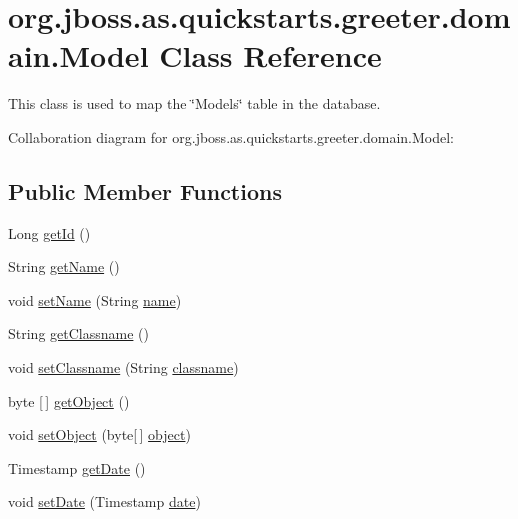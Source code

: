 \hypertarget{classorg_1_1jboss_1_1as_1_1quickstarts_1_1greeter_1_1domain_1_1_model}{}\section{org.\+jboss.\+as.\+quickstarts.\+greeter.\+domain.\+Model Class Reference}
\label{classorg_1_1jboss_1_1as_1_1quickstarts_1_1greeter_1_1domain_1_1_model}


This class is used to map the \char`\"{}\+Models\char`\"{} table in the database.  




Collaboration diagram for org.\+jboss.\+as.\+quickstarts.\+greeter.\+domain.\+Model\+:
\subsection*{Public Member Functions}
\begin{DoxyCompactItemize}
\item 
Long \hyperlink{classorg_1_1jboss_1_1as_1_1quickstarts_1_1greeter_1_1domain_1_1_model_a16fdd8977d13de78bc32beb058b595f7}{get\+Id} ()
\item 
String \hyperlink{classorg_1_1jboss_1_1as_1_1quickstarts_1_1greeter_1_1domain_1_1_model_ab66dbfbb26fd2d261f02388397b66db1}{get\+Name} ()
\item 
void \hyperlink{classorg_1_1jboss_1_1as_1_1quickstarts_1_1greeter_1_1domain_1_1_model_a0f33d9ffbe653cd50c8c334e7f8c49ff}{set\+Name} (String \hyperlink{classorg_1_1jboss_1_1as_1_1quickstarts_1_1greeter_1_1domain_1_1_model_a9e9a3d455bb7e29de4f5f1d28c3b21f1}{name})
\item 
String \hyperlink{classorg_1_1jboss_1_1as_1_1quickstarts_1_1greeter_1_1domain_1_1_model_a041be61bcc932edf5a1629c4c5b10bbd}{get\+Classname} ()
\item 
void \hyperlink{classorg_1_1jboss_1_1as_1_1quickstarts_1_1greeter_1_1domain_1_1_model_aa4c2b7364259d77fdae599e67d12246a}{set\+Classname} (String \hyperlink{classorg_1_1jboss_1_1as_1_1quickstarts_1_1greeter_1_1domain_1_1_model_ad7f79460581991f10f809399af81deed}{classname})
\item 
byte \mbox{[}$\,$\mbox{]} \hyperlink{classorg_1_1jboss_1_1as_1_1quickstarts_1_1greeter_1_1domain_1_1_model_a76e62d859cf14a164639170dd87ce4ff}{get\+Object} ()
\item 
void \hyperlink{classorg_1_1jboss_1_1as_1_1quickstarts_1_1greeter_1_1domain_1_1_model_ad3694337d40d3e4f51fd10b15f8cae6c}{set\+Object} (byte\mbox{[}$\,$\mbox{]} \hyperlink{classorg_1_1jboss_1_1as_1_1quickstarts_1_1greeter_1_1domain_1_1_model_a1c1b50288522353b7e49a08abaa60153}{object})
\item 
Timestamp \hyperlink{classorg_1_1jboss_1_1as_1_1quickstarts_1_1greeter_1_1domain_1_1_model_a5d34b84929a08cec4dd4e37ded6072d6}{get\+Date} ()
\item 
void \hyperlink{classorg_1_1jboss_1_1as_1_1quickstarts_1_1greeter_1_1domain_1_1_model_a65e6201abb83d9db88b33180166ffaac}{set\+Date} (Timestamp \hyperlink{classorg_1_1jboss_1_1as_1_1quickstarts_1_1greeter_1_1domain_1_1_model_a133ea828b8b661c399c0046d9f2e6f5c}{date})
\end{DoxyCompactItemize}
